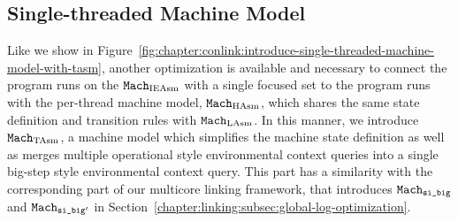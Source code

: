 \subsection{Single-threaded Machine Model}
\label{chapter:linking:subsec:single-threaded-machine-model}

Like we show in Figure~\ref{fig:chapter:conlink:introduce-single-threaded-machine-model-with-tasm}, 
another optimization is available and necessary 
to connect the program runs on the ${\mathrm{\texttt{Mach}}}_{\mathrm{IEAsm}}$ with  a single focused set to
the program runs with the per-thread machine model, ${\mathrm{\texttt{Mach}}}_{\mathrm{HAsm}}$, which shares the 
same state definition and transition rules with ${\mathrm{\texttt{Mach}}}_{\mathrm{LAsm}}$. 
In this manner,
we introduce ${\mathrm{\texttt{Mach}}}_{\mathrm{TAsm}}$, a machine model
which simplifies the machine state definition as  well as
merges multiple operational style environmental context queries into a single big-step style 
environmental context query.  
This part has a similarity with the corresponding part of our multicore linking framework, 
that introduces ${{{\mathrm{\texttt{Mach}}}}_{{\mathrm{\texttt{si\_big}}}}}$ and ${{{\mathrm{\texttt{Mach}}}}_{{\mathrm{\texttt{si\_big}}}'}}$ in Section~\ref{chapter:linking:subsec:global-log-optimization}.



%
%
%


